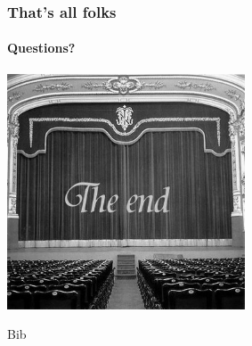 \documentclass[serif]{beamer}
\begin{document}
	\begin{frame}
		\frametitle{That's all folks}
		\framesubtitle{Questions?}
		
		\begin{center}
			\includegraphics[height=2.75in]{images/end}	
		\end{center}
		
	\end{frame}

	\begin{frame}
		Bib
	\end{frame}
	
\end{document}
